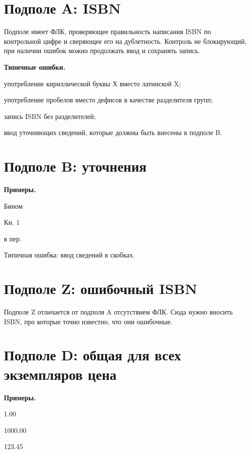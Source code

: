 \section{Подполе A: ISBN}

Подполе имеет ФЛК, проверяющее правильность написания ISBN по контрольной цифре и сверяющее его на дублетность. Контроль не блокирующий, при наличии ошибок можно продолжать ввод и сохранять запись.

\textbf{Типичные ошибки.}

\begin{cutelist}
    \item употребление кириллической буквы Х вместо латинской X;
    \item употребление пробелов вместо дефисов в качестве разделителя групп;
    \item запись ISBN без разделителей;
    \item ввод уточняющих сведений, которые должны быть внесены в подполе B.
\end{cutelist}

\section{Подполе B: уточнения}

\textbf{Примеры.}

\begin{cutelist}
    \item Бином
    \item Кн. 1
    \item в пер.
\end{cutelist}

Типичная ошибка: ввод сведений в скобках.

\section{Подполе Z: ошибочный ISBN}

Подполе Z отличается от подполя A отсутствием ФЛК. Сюда нужно вносить ISBN, про которые точно известно, что они ошибочные.

\section{Подполе D: общая для всех экземпляров цена}

\textbf{Примеры.}

\begin{cutelist}
    \item 1.00
    \item 1000.00
    \item 123.45
\end{cutelist}

